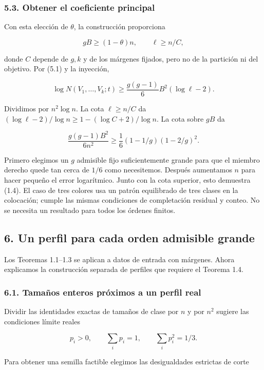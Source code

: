 \documentclass[spanish,11pt,a4paper]{article}
\begin{document}
\subsubsection{5.3. Obtener el coeficiente principal}\label{obtener-el-coeficiente-principal}

Con esta elección de \(\theta\), la construcción proporciona

\[gB\ge(1-\theta)n,\qquad \ell\ge n/C,\]

donde \(C\) depende de \(g,k\) y de los márgenes fijados, pero no de la partición ni del objetivo. Por (5.1) y la inyección,

\[\log N(V_1,\ldots,V_k;t)\ge\frac{g(g-1)}6 B^2(\log\ell-2).\tag{5.3}\]

Dividimos por \(n^2\log n\). La cota \(\ell\ge n/C\) da \((\log\ell-2)/\log n\ge1-(\log C+2)/\log n\). La cota sobre \(gB\) da

\[\frac{g(g-1)B^2}{6n^2}\ge\frac16(1-1/g)(1-2/g)^2.\]

Primero elegimos un \(g\) admisible fijo suficientemente grande para que el miembro derecho quede tan cerca de \(1/6\) como necesitemos. Después aumentamos \(n\) para hacer pequeño el error logarítmico. Junto con la cota superior, esto demuestra (1.4). El caso de tres colores usa un patrón equilibrado de tres clases en la colocación; cumple las mismas condiciones de completación residual y conteo. No se necesita un resultado para todos los órdenes finitos.

\subsection{6. Un perfil para cada orden admisible grande}\label{un-perfil-para-cada-orden-admisible-grande}

Los Teoremas 1.1--1.3 se aplican a datos de entrada con márgenes. Ahora explicamos la construcción separada de perfiles que requiere el Teorema 1.4.

\subsubsection{6.1. Tamaños enteros próximos a un perfil real}\label{tamauxf1os-enteros-pruxf3ximos-a-un-perfil-real}

Dividir las identidades exactas de tamaños de clase por \(n\) y por \(n^2\) sugiere las condiciones límite reales

\[p_i>0,\qquad \sum_i p_i=1,\qquad \sum_i p_i^2=1/3.\]

Para obtener una semilla factible elegimos las desigualdades estrictas de corte
\end{document}
